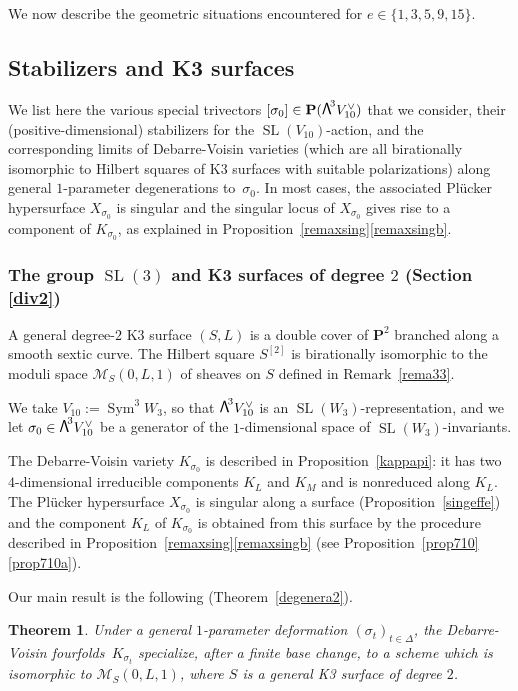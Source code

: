 \documentclass[JEP,XML,SOM,Unicode, NoEqCountersInSection,NoFloatCountersInSection]{cedram}
\let\mathcal\mathscr
\newtheorem{theo}[lemm]{Theorem}
\theoremstyle{definition}
\renewcommand\P{{\mathbf P}}\let\PP\P
\newcommand\cM{\mathcal{M}}
\DeclareMathOperator{\Sym}{Sym}
\DeclareMathOperator{\SL}{SL}
\newcommand\bw[1]{{\hbox{\large$\mathsf{\Lambda}$}^{\!#1}}}
\newcommand\hilbS{S^{[2]}}
\begin{document}
We now describe the
geometric situations encountered for $e\in\{1,3,5,9,15\}$.

\subsection{Stabilizers and K3 surfaces}\label{sec11}

We list here the various special trivectors $[\sigma_0]\in \P(\bw3V_{10}^\vee)$ that we consider,
their (positive-dimensional) stabilizers for the $\SL(V_{10})$-action, and the corresponding limits of Debarre-Voisin varieties
(which are all birationally isomorphic to Hilbert squares of K3 surfaces with suitable polarizations) along general $1$-parameter degenerations to~$\sigma_0$. In most cases, the associated Plücker hypersurface $X_{\sigma_0}$ is singular and the singular locus of $X_{\sigma_0}$ gives rise to a component of $K_{\sigma_0}$, as explained in Proposition~\ref{remaxsing}\eqref{remaxsingb}.

\subsubsection{The group $\SL(3)$ and K3 surfaces of degree $2$ (Section \ref{div2})} \label{s111}

A general degree\nobreakdash-$2$ K3 surface $(S,L)$ is a double cover of $ \P^2$ branched along a smooth sextic curve. The Hilbert square $\hilbS $ is birationally isomorphic to the moduli space $\cM_S(0,L,1)$ of sheaves on $S$ defined in Remark~\ref{rema33}.

We take $V_{10}:=\Sym^3 \!W_3$, so that $\bw3 V^{\vee}_{10}$ is an $\SL(W_3)$-representation, and we let $\sigma_0\in \bw3 V^{\vee}_{10}$ be a generator of the $1$-dimensional space of
$\SL(W_3)$-invariants.

The Debarre-Voisin variety $K_{\sigma_0}$ is described in Proposition~\ref{kappapi}: it has two $4$-dimen\-sional irreducible components $K_L$ and $K_M$ and is nonreduced along $K_L$. The Plücker hypersurface $X_{\sigma_0}$ is singular along a surface (Proposition~\ref{singeffe}) and the
component $K_L$ of $K_{\sigma_0}$ is obtained from this surface by the procedure described in Proposition~\ref{remaxsing}\eqref{remaxsingb} (see Proposition~\ref{prop710}\eqref{prop710a}).

Our main result is the following (Theorem~\ref{degenera2}).

{
\begin{theo} \label{theodue}
Under a general $1$-parameter deformation
$(\sigma_t)_{t\in \Delta}$, the Debarre-Voisin fourfolds~$K_{\sigma_t}$ specialize, after a finite base change, to a scheme which is isomorphic
to $\cM_S(0,L,1)$, where $S$ is a general K3 surface of degree $2$.
\end{theo}}
\end{document}
